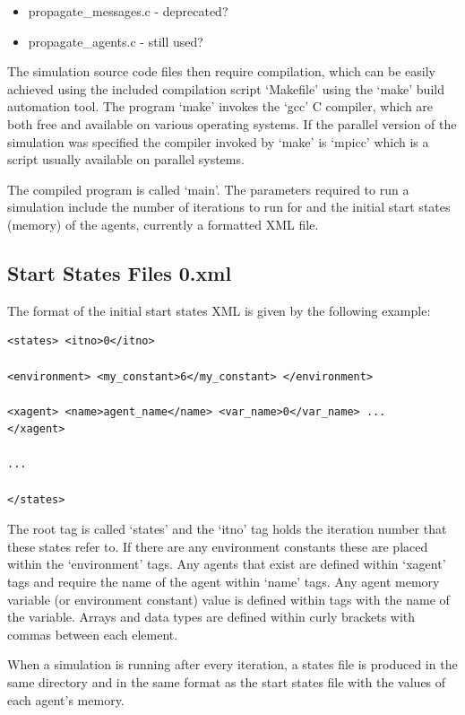 \documentclass[a4paper,11pt]{article}
\newenvironment{mylisting}
{\begin{list}{}{\setlength{\leftmargin}{1em}}\item\small\bfseries}
{\end{list}}
\begin{document}
\begin{itemize}
  \item propagate\_messages.c - deprecated?
  \item propagate\_agents.c - still used?
\end{itemize}

The simulation source code files then require compilation, which can
be easily achieved using the included compilation script `Makefile'
using the `make' build automation tool. The program `make' invokes
the `gcc' C compiler, which are both free and available on various
operating systems. If the parallel version of the simulation was
specified the compiler invoked by `make' is `mpicc' which is a
script usually available on parallel systems.

The compiled program is called `main'. The parameters required to
run a simulation include the number of iterations to run for and the
initial start states (memory) of the agents, currently a formatted
XML file.

\subsection{Start States Files 0.xml}

The format of the initial start states XML is given by the following
example:

\begin{mylisting}
\begin{verbatim}
<states> <itno>0</itno>

<environment> <my_constant>6</my_constant> </environment>

<xagent> <name>agent_name</name> <var_name>0</var_name> ...
</xagent>

...

</states>
\end{verbatim}
\end{mylisting}

The root tag is called `states' and the `itno' tag holds the
iteration number that these states refer to. If there are any
environment constants these are placed within the `environment'
tags. Any agents that exist are defined within `xagent' tags and
require the name of the agent within `name' tags. Any agent memory
variable (or environment constant) value is defined within tags with
the name of the variable. Arrays and data types are defined within
curly brackets with commas between each element.

When a simulation is running after every iteration, a states file is
produced in the same directory and in the same format as the start
states file with the values of each agent's memory.
\end{document}
